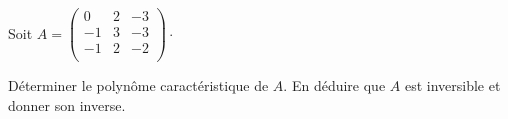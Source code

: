 \documentclass[french,11pt,twoside]{VcCours}
\begin{document}
\begin{ApplicationDirecte}{} Soit $A = \begin{pmatrix}
0& 2 & -3 \\
-1 & 3 & -3 \\
-1 & 2 & -2 \\
\end{pmatrix} \cdot$

Déterminer le polynôme caractéristique de $A$. En déduire que $A$ est inversible et donner son inverse.
\end{ApplicationDirecte}
\end{document}
